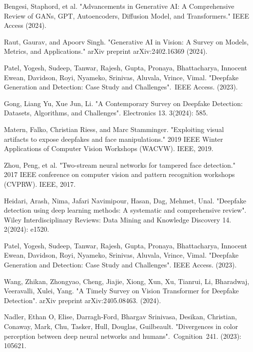 \documentclass{svproc}
\begin{document}
\begin{thebibliography}{6}

  Bengesi, Staphord, et al. "Advancements in Generative AI: A Comprehensive
  Review of GANs, GPT, Autoencoders, Diffusion Model, and Transformers." IEEE
  Access (2024).

  Raut, Gaurav, and Apoorv Singh. "Generative AI in Vision: A Survey on Models,
  Metrics, and Applications." arXiv preprint arXiv:2402.16369 (2024).

  Patel, Yogesh, Sudeep, Tanwar, Rajesh, Gupta, Pronaya, Bhattacharya, Innocent Ewean, Davidson, Royi, Nyameko, Srinivas, Aluvala, Vrince, Vimal. "Deepfake Generation and Detection: Case Study and Challenges". IEEE Access. (2023).

  Gong, Liang Yu, Xue Jun, Li. "A Contemporary Survey on Deepfake Detection:
  Datasets, Algorithms, and Challenges". Electronics 13. 3(2024): 585.

  Matern, Falko, Christian Riess, and Marc Stamminger. "Exploiting visual artifacts to expose deepfakes and face manipulations." 2019 IEEE Winter Applications of Computer Vision Workshops (WACVW). IEEE, 2019.

  Zhou, Peng, et al. "Two-stream neural networks for tampered face detection." 2017 IEEE conference on computer vision and pattern recognition workshops (CVPRW). IEEE, 2017.

  Heidari, Arash, Nima, Jafari Navimipour, Hasan, Dag, Mehmet, Unal. "Deepfake
  detection using deep learning methods: A systematic and comprehensive
  review".
  Wiley Interdisciplinary Reviews: Data Mining and Knowledge Discovery 14.
  2(2024): e1520.

  Patel, Yogesh, Sudeep, Tanwar, Rajesh, Gupta, Pronaya, Bhattacharya, Innocent
  Ewean, Davidson, Royi, Nyameko, Srinivas, Aluvala, Vrince, Vimal. "Deepfake
  Generation and Detection: Case Study and Challenges". IEEE Access. (2023).

  Wang, Zhikan, Zhongyao, Cheng, Jiajie, Xiong, Xun, Xu, Tianrui, Li, Bharadwaj, Veeravalli, Xulei, Yang. "A Timely Survey on Vision Transformer for Deepfake Detection". arXiv preprint arXiv:2405.08463. (2024).

  Nadler, Ethan O, Elise, Darragh-Ford, Bhargav Srinivasa, Desikan, Christian, Conaway, Mark, Chu, Tasker, Hull, Douglas, Guilbeault. "Divergences in color perception between deep neural networks and humans". Cognition 241. (2023): 105621.


\end{thebibliography}
\end{document}
